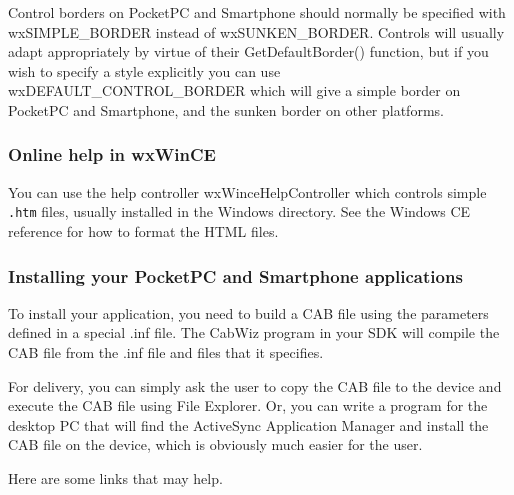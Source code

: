Control borders on PocketPC and Smartphone should normally be specified with
wxSIMPLE\_BORDER instead of wxSUNKEN\_BORDER. Controls will usually adapt
appropriately by virtue of their GetDefaultBorder() function, but if you
wish to specify a style explicitly you can use wxDEFAULT\_CONTROL\_BORDER
which will give a simple border on PocketPC and Smartphone, and the sunken border on
other platforms.

\subsubsection{Online help in wxWinCE}

You can use the help controller wxWinceHelpController which controls
simple {\tt .htm} files, usually installed in the Windows directory.
See the Windows CE reference for how to format the HTML files.

\subsubsection{Installing your PocketPC and Smartphone applications}

To install your application, you need to build a CAB file using
the parameters defined in a special .inf file. The CabWiz program
in your SDK will compile the CAB file from the .inf file and
files that it specifies.

For delivery, you can simply ask the user to copy the CAB file to the
device and execute the CAB file using File Explorer. Or, you can
write a program for the desktop PC that will find the ActiveSync
Application Manager and install the CAB file on the device,
which is obviously much easier for the user.

Here are some links that may help.

